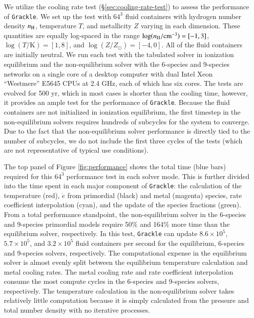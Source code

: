 We utilize the cooling rate test (\S\ref{sec:cooling-rate-test}) to
assess the performance of \texttt{Grackle}.  We set up the test with $64^3$
fluid containers with hydrogen number density $n_{\rm H}$, temperature
$T$, and metallicity $Z$ varying in each dimension.  These quantities
are equally log-spaced in the range $\log (n_{\rm H} /
\textrm{cm}^{-3}) = [-1, 3]$, $\log (T/\textrm{K}) = [1, 8]$, and
$\log (Z/Z_\odot) = [-4, 0]$.  All of the fluid containers are
initially neutral.  We run each test with the tabulated solver in
ionization equilibrium and the non-equilibrium solver with the
6-species and 9-species networks on a single core of a desktop
computer with dual Intel Xeon ``Westmere'' E5645 CPUs at 2.4 GHz, each
of which has six cores.  The tests are evolved for 500 yr, which in
most cases is shorter than the cooling time, however, it provides an
ample test for the performance of \texttt{Grackle}.  Because the fluid
containers are not initialized in ionization equilibrium, the first
timestep in the non-equilibrium solvers requires hundreds of subcycles
for the system to converge.  Due to the fact that the non-equilibrium solver
performance is directly tied to the number of subcycles, we do not
include the first three cycles of the tests (which are not representative of
typical use conditions).


The top panel of Figure \ref{fig:performance} shows the total time
(blue bars) required for this $64^3$ performance test in each solver
mode.  This is further divided into the time spent in each major
component of \texttt{Grackle}: the calculation of the temperature (red),
$\dot{e}$ from primordial (black) and metal (magenta) species, rate
coefficient interpolation (cyan), and the update of the species
fractions (green).  From a total performance standpoint, the
non-equilibrium solver in the 6-species and 9-species primordial
models require 50\% and 164\% more time than the equilibrium solver,
respectively.  In this test, \texttt{Grackle} can update $8.6 \times 10^5$,
$5.7 \times 10^5$, and $3.2 \times 10^5$ fluid containers per second
for the equilibrium, 6-species and 9-species solvers, respectively.
The computational expense in the equilibrium solver is almost evenly
split between the equilibrium temperature calculation and metal
cooling rates.  The metal cooling rate and rate coefficient
interpolation consume the most compute cycles in the 6-species and
9-species solvers, respectively.  The temperature calculation in the
non-equilibrium solver takes relatively little computation because it
is simply calculated from the pressure and total number density with
no iterative processes.

